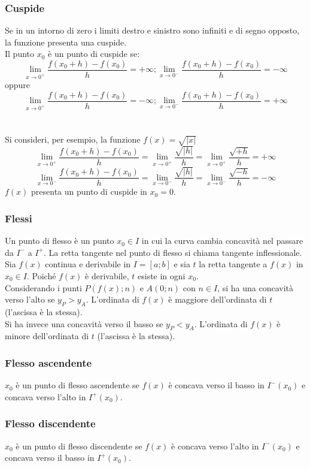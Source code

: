 \documentclass[a4paper,14pt]{extarticle}
\begin{document}
\subsubsection{Cuspide}
Se in un intorno di zero i limiti destro e sinistro sono infiniti e di segno opposto, la funzione presenta una cuspide. \\ Il punto $x_0$ è un punto di cuspide se:
$$\lim_{x\to0^+} \frac{f(x_0 + h) - f(x_0)}{h} = +\infty ; \lim_{x\to0^-} \frac{f(x_0 + h) - f(x_0)}{h} = -\infty$$
oppure \\
$$\lim_{x\to0^+} \frac{f(x_0 + h) - f(x_0)}{h} = -\infty ; \lim_{x\to0^-} \frac{f(x_0 + h) - f(x_0)}{h} = +\infty$$
\\ \\
Si consideri, per esempio, la funzione $f(x) = \sqrt{|x|}$\\
$$\lim_{x\to0^+} \frac{f(x_0 + h) - f(x_0)}{h} = \lim_{x\to0^+} \frac{\sqrt{|h|}}{h} = \lim_{x\to0^+} \frac{\sqrt{+h}}{h} = +\infty$$
$$\lim_{x\to0^-} \frac{f(x_0 + h) - f(x_0)}{h} = \lim_{x\to0^-} \frac{\sqrt{|h|}}{h} = \lim_{x\to0^-} \frac{\sqrt{-h}}{h} = -\infty$$
$f(x)$ presenta un punto di cuspide in $x_0 = 0$.


\subsubsection{Flessi}
Un punto di flesso è un punto $x_0 \in I$ in cui la curva cambia concavità nel passare da $I^-$ a $I^+$. La retta tangente nel punto di flesso si chiama tangente inflessionale. 
\newline
Sia $f(x)$ continua e derivabile in $I = [a; b]$ e sia $t$ la retta tangente a $f(x)$ in $x_0 \in I$. Poiché $f(x)$ è derivabile, $t$ esiste in ogni $x_0$. \\ Considerando i punti $P(f(x); n)$ e $A(0; n)$ con $n \in I$, si ha una concavità verso l'alto se $y_P > y_A$. L'ordinata di $f(x)$ è maggiore dell'ordinata di $t$ (l'ascissa è la stessa). \\Si ha invece una concavità verso il basso se $y_P < y_A$. L'ordinata di $f(x)$ è minore dell'ordinata di $t$ (l'ascissa è la stessa).

\subsubsection{Flesso ascendente}
$x_0$ è un punto di flesso ascendente se $f(x)$ è concava verso il basso in $I^-(x_0)$ e concava verso l'alto in $I^+(x_0)$.
\subsubsection{Flesso discendente}
$x_0$ è un punto di flesso discendente se $f(x)$ è concava verso l'alto in $I^-(x_0)$ e concava verso il basso in $I^+(x_0)$.
\end{document}
